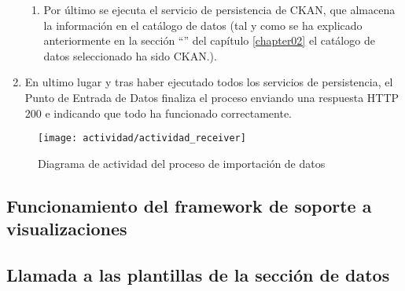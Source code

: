 \begin{enumerate}
\begin{enumerate}
			\item Por último se ejecuta el servicio de persistencia de CKAN, que almacena la información en el catálogo de datos (tal y como se ha explicado anteriormente en la sección ``'' del capítulo \ref{chapter02} el catálogo de datos seleccionado ha sido CKAN.).
		\end{enumerate}
	\item En ultimo lugar y tras haber ejecutado todos los servicios de persistencia, el Punto de Entrada de Datos finaliza el proceso enviando una respuesta HTTP 200 e indicando que todo ha funcionado correctamente.
\end{enumerate}

\begin{figure}[ht]
	\centering
	\texttt{[image: actividad/actividad\_receiver]}
	\caption{Diagrama de actividad del proceso de importación de datos}
	\label{fig:diagrama_actividad_receiver}
\end{figure}


\subsection{Funcionamiento del framework de soporte a visualizaciones}


\subsection{Llamada a las plantillas de la sección de datos}